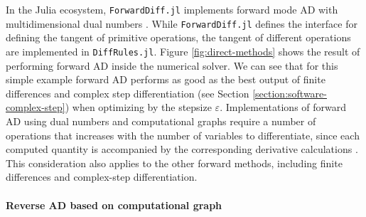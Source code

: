 In the Julia ecosystem, \texttt{ForwardDiff.jl} implements forward mode AD with multidimensional dual numbers \cite{RevelsLubinPapamarkou2016}. 
While \texttt{ForwardDiff.jl} defines the interface for defining the tangent of primitive operations, the tangent of different operations are implemented in \texttt{DiffRules.jl}. 
Figure \ref{fig:direct-methods} shows the result of performing forward AD inside the numerical solver.
We can see that for this simple example forward AD performs as good as the best output of finite differences and complex step differentiation (see Section \ref{section:software-complex-step}) when optimizing by the stepsize $\varepsilon$. 
Implementations of forward AD using dual numbers and computational graphs require a number of operations that increases with the number of variables to differentiate, since each computed quantity is accompanied by the corresponding derivative calculations \cite{Griewank_1989}. 
This consideration also applies to the other forward methods, including finite differences and complex-step differentiation.

\paragraph{Reverse AD based on computational graph}
\label{sec:software-reverse-AD}

